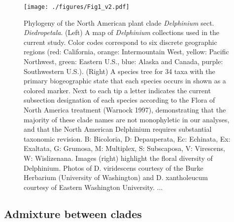 \documentclass[11pt]{article}
\begin{document}
\begin{figure}[t!]
	\centering
	\texttt{[image: ./figures/Fig1\_v2.pdf]}	
	\caption{
	Phylogeny of the North American plant clade \emph{Delphinium} sect. 
	\emph{Diedropetala}.
	(Left) A map of \emph{Delphinium} collections used in the current study.
	Color codes correspond to six discrete geographic regions 
	(red: California, orange: Intermountain West, yellow: Pacific Northwest, 
	green: Eastern U.S., blue: Alaska and Canada, purple: Southwestern U.S.). 
	(Right) A species tree for 34 taxa with the primary biogeographic state
	that each species occurs in shown as a colored marker. 
	Next to each tip a letter indicates the current subsection designation of each species according to the Flora of North America treatment (Warnock 1997), demonstrating that the majority of these clade names are not monophyletic in our analyses, and that the North American Delphinium requires substantial taxonomic revision. B: Bicoloria, D: Depauperata, Ec: Echinata, Ex: Exaltata, G: Grumosa, M: Multiplex, S: Subscaposa, V: Virescens, W: Wislizenana. Images (right) highlight the floral diversity of Delphinium. Photos of D. viridescens courtesy of the Burke Herbarium (University of Washington) and D. xantholeucum courtesy of Eastern Washington University.
	...
	}
	\label{fig:sptree}
\end{figure}


\subsection{Admixture between clades}

% 
\end{document}
